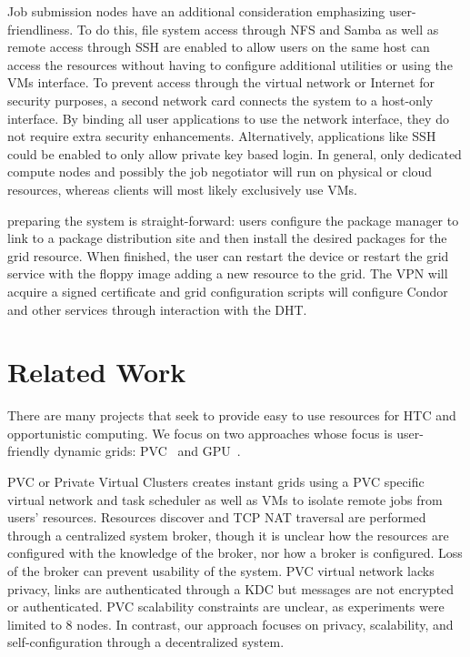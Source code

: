 Job submission nodes have an additional consideration emphasizing
user-friendliness.  To do this, file system access through NFS and Samba
as well as remote access through SSH are enabled to allow users on the same
host can access the resources without having to configure additional utilities
or using the VMs interface.  To prevent access through the virtual network or
Internet for security purposes, a second network card connects the system to
a host-only interface.  By binding all user applications to use the network
interface, they do not require extra security enhancements.  Alternatively,
applications like SSH could be enabled to only allow private key based login.
In general, only dedicated compute nodes and possibly the job negotiator will
run on physical or cloud resources, whereas clients will most likely
exclusively use VMs.

preparing the system is straight-forward: users configure the package manager to
link to a package distribution site and then install the desired packages for
the grid resource.  When finished, the user can restart the device or restart
the grid service with the floppy image adding a new resource to the grid.  The
VPN will acquire a signed certificate and grid configuration scripts will
configure Condor and other services through interaction with the DHT.

\section{Related Work}
\label{related_work}
There are many projects that seek to provide easy to use resources for HTC
and opportunistic computing.  We focus on two approaches whose focus is
user-friendly dynamic grids: PVC~\cite{pvc} and GPU~\cite{gpu}.

PVC or Private Virtual Clusters creates instant grids using a PVC specific
virtual network and task scheduler as well as VMs to isolate remote jobs from
users' resources.  Resources discover and TCP NAT traversal are performed
through a centralized system broker, though it is unclear how the resources are
configured with the knowledge of the broker, nor how a broker is configured.
Loss of the broker can prevent usability of the system.  PVC virtual network
lacks privacy, links are authenticated through a KDC but messages are not
encrypted or authenticated.  PVC scalability constraints are unclear, as
experiments were limited to 8 nodes.  In contrast, our approach focuses on
privacy, scalability, and self-configuration through a decentralized system.

